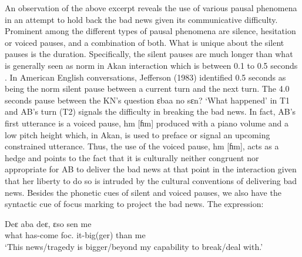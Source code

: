 \documentclass[output=paper,colorlinks,citecolor=brown]{langscibook}
\begin{document}
An observation of the above excerpt reveals the use of various pausal phenomena in an attempt to hold back the bad news given its communicative difficulty. Prominent among the different types of pausal phenomena are silence, hesitation or voiced pauses, and a combination of both. What is unique about the silent pauses is the duration. Specifically, the silent pauses are much longer than what is generally seen as norm in Akan interaction which is between 0.1 to 0.5 seconds \citep{Obeng1987, Obeng1989, Obeng1999} . In American English conversations, Jefferson (1983) identified 0.5 seconds as being the norm silent pause between a current turn and the next turn. The 4.0 seconds pause between the KN’s question ɛbaa no sɛn? ‘What happened’ in T1 and AB’s turn (T2) signals the difficulty in breaking the bad news. In fact, AB’s first utterance is a voiced pause, hm [ɦm] produced with a piano volume and a low pitch height which, in Akan, is used to preface or signal an upcoming constrained utterance. Thus, the use of the voiced pause, hm [ɦm], acts as a hedge and points to the fact that it is culturally neither congruent nor appropriate for AB to deliver the bad news at that point in the interaction given that her liberty to do so is intruded by the cultural conventions of delivering bad news. Besides the phonetic cues of silent and voiced pauses, we also have the syntactic cue of focus marking to project the bad news. The expression:

\ea
    \gll    Deɛ aba deɛ, ɛso sen me\\
            what has-come foc. it-big(ger) than me\\
    \glt    `This news/tragedy is bigger/beyond my capability to break/deal with.'
\z
\end{document}
